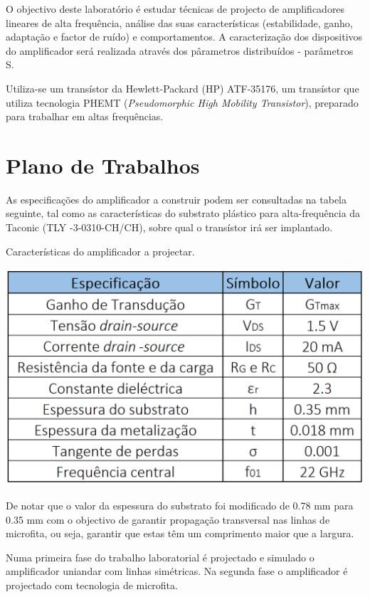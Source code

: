 \documentclass[11pt]{article}
\numberwithin{equation}{section}
\begin{document}
O objectivo deste laboratório é estudar técnicas de projecto de amplificadores lineares de alta frequência, análise das suas características (estabilidade, ganho, adaptação e factor de ruído) e comportamentos. A caracterização dos dispositivos do amplificador será realizada através dos pârametros distribuídos - parâmetros S.

Utiliza-se um transístor da Hewlett-Packard (HP) ATF-35176, um transístor que utiliza tecnologia PHEMT (\textit{Pseudomorphic High Mobility Transistor}), preparado para trabalhar em altas frequências.

\section{Plano de Trabalhos}
\label{sec:Pla_Trab}

As especificações do amplificador a construir podem ser consultadas na tabela seguinte, tal como as características do substrato plástico para alta-frequência da Taconic (TLY -3-0310-CH/CH), sobre qual o transístor irá ser implantado. 

\begin{table}[H]
	\centering
	\caption{Características do amplificador a projectar.}
	\vspace{-1.5mm}
	\includegraphics[keepaspectratio=true, scale=0.40]{teoricas/table1}
	\label{tab:car}
\end{table}

De notar que o valor da espessura do substrato foi modificado de 0.78 mm para 0.35 mm com o objectivo de garantir propagação transversal nas linhas de microfita, ou seja, garantir que estas têm um comprimento maior que a largura. 

Numa primeira fase do trabalho laboratorial é projectado e simulado o amplificador uniandar com linhas simétricas. Na segunda fase o amplificador é projectado com tecnologia de microfita.
\end{document}
